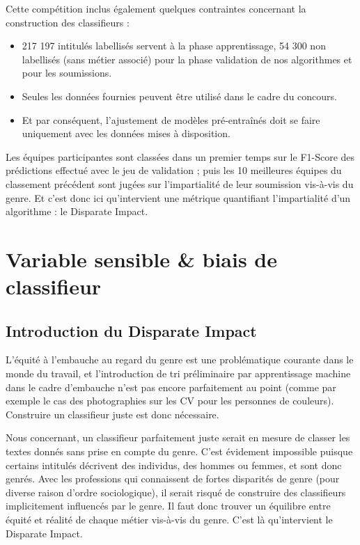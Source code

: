 Cette compétition inclus également quelques contraintes concernant la construction des classifieurs :

\begin{itemize}
\item 217 197 intitulés labellisés servent à la phase apprentissage, 54 300 non labellisés (sans métier associé) pour la phase validation de nos algorithmes et pour les soumissions.
\item Seules les données fournies peuvent être utilisé dans le cadre du concours.
\item Et par conséquent, l’ajustement de modèles pré-entraînés doit se faire uniquement avec les données mises à disposition.
\end{itemize}

Les équipes participantes sont classées dans un premier temps sur le F1-Score des prédictions effectué avec le jeu de validation ; puis les 10 meilleures équipes du classement précédent sont jugées sur l’impartialité de leur soumission vis-à-vis du genre. Et c'est donc ici qu’intervient une métrique quantifiant l’impartialité d’un algorithme : le Disparate Impact. 

\section{Variable sensible \& biais de classifieur}

\subsection{Introduction du Disparate Impact} \hfill
\newline

L’équité à l’embauche au regard du genre est une problématique courante dans le monde du travail, et l’introduction de tri préliminaire par apprentissage machine dans le cadre d’embauche n'est pas encore parfaitement au point (comme par exemple le cas des photographies sur les CV pour les personnes de couleurs). Construire un classifieur juste est donc nécessaire. 

Nous concernant, un classifieur parfaitement juste serait en mesure de classer les textes donnés sans prise en compte du genre. C'est évidement impossible puisque certains intitulés décrivent des individus, des hommes ou femmes, et sont donc genrés. Avec les professions qui connaissent de fortes disparités de genre (pour diverse raison d’ordre sociologique), il serait risqué de construire des classifieurs implicitement influencés par le genre. Il faut donc trouver un équilibre entre équité et réalité de chaque métier vis-à-vis du genre. C’est là qu’intervient le Disparate Impact.
\newline

